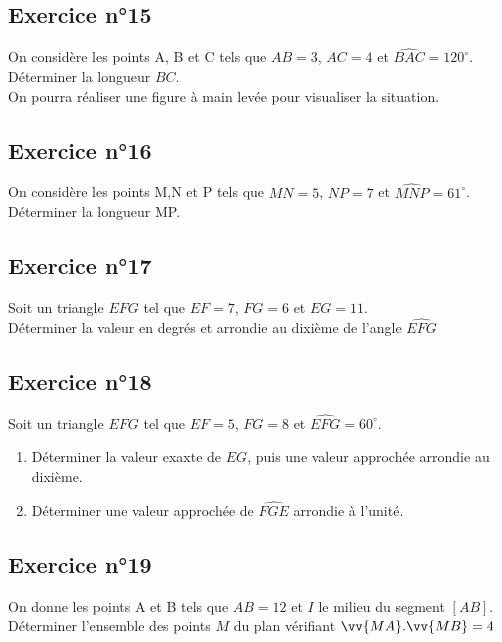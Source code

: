 \documentclass[12pt,a4paper]{article}
\begin{document}
\subsection*{Exercice n°15} 

On considère les points A, B et C tels que $AB=3$, $AC=4$ et $\widehat{BAC}=120^\circ$.\\
Déterminer la longueur $BC$.\\
On pourra réaliser une figure à main levée pour visualiser la situation.


\subsection*{Exercice n°16} 

On considère les points M,N et P tels que $MN=5$, $NP=7$ et $\widehat{MNP}=61^\circ$.\\
Déterminer la longueur MP.

\subsection*{Exercice n°17} 

Soit un triangle $EFG$ tel que $EF=7$, $FG=6$ et $EG=11$.\\
Déterminer la valeur en degrés et arrondie au dixième de l'angle $\widehat{EFG}$

\subsection*{Exercice n°18} 

Soit un triangle $EFG$ tel que $EF=5$, $FG=8$ et $\widehat{EFG}=60^\circ$.\\

\begin{enumerate}
    \item Déterminer la valeur exaxte de $EG$, puis une valeur approchée  arrondie au dixième.
    \item Déterminer une valeur approchée de $\widehat{FGE}$ arrondie à l'unité.
\end{enumerate}

\subsection*{Exercice n°19} 

On donne les points A et B tels que $AB=12$ et $I$ le milieu du segment $[AB]$.\\
Déterminer l'ensemble des points $M$ du plan vérifiant $\vv{MA}.\vv{MB}=4$
\end{document}
